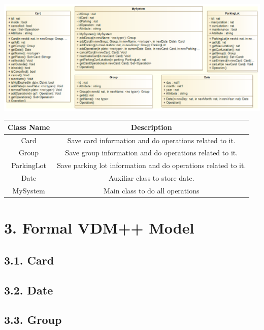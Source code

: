 \documentclass[12pt]{report}
\begin{document}
\includegraphics[width=\textwidth,height=\textheight,keepaspectratio]{mfes-class-diagram}

\begin{longtable}{|c|c|}
\hline
\textbf{Class Name} & \textbf{Description} \\
\hline
Card & Save card information and do operations related to it.\\
\hline
Group & Save group information and do operations related to it.\\
\hline
ParkingLot & Save parking lot information and do operations related to it.\\
\hline
Date & Auxiliar class to store date.\\
\hline
MySystem & Main class to do all operations \\
\hline
\end{longtable}

\newpage

\section*{3. Formal VDM++ Model}

\subsection*{3.1. Card}

\subsection*{3.2. Date}

\subsection*{3.3. Group}

\end{document}
